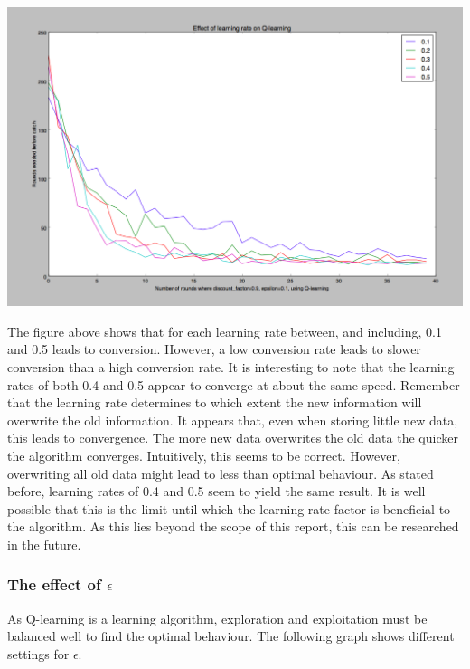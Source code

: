 \documentclass{article}
\begin{document}
\begin{center}
	\includegraphics[scale=0.2]{learning_rates}
\end{center}



The figure above shows that for each learning rate between, and including, 0.1 and 0.5 leads to conversion. However, a low conversion rate leads to slower conversion than a high conversion rate. It is interesting to note that the learning rates of both 0.4 and 0.5 appear to converge at about the same speed. Remember that the learning rate determines to which extent the new information will overwrite the old information. It appears that, even when storing little new data, this leads to convergence. The more new data overwrites the old data the quicker the algorithm converges. Intuitively, this seems to be correct. However, overwriting all old data might lead to less than optimal behaviour. As stated before, learning rates of 0.4 and 0.5 seem to yield the same result. It is well possible that this is the limit until which the learning rate factor is beneficial to the algorithm. As this lies beyond the scope of this report, this can be researched in the future.
\subsubsection{The effect of $\epsilon$}
As Q-learning is a learning algorithm, exploration and exploitation must be balanced well to find the optimal behaviour. The following graph shows different settings for $\epsilon$. 
\end{document}
